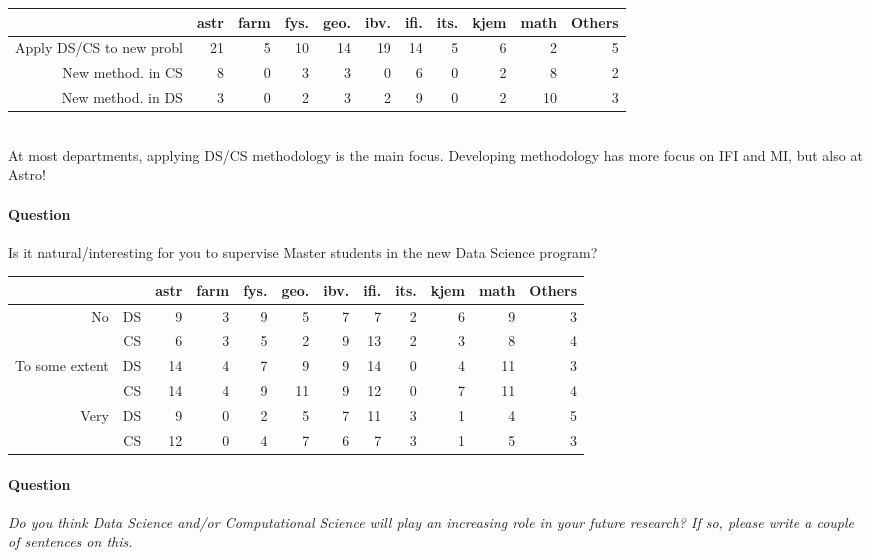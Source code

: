 \documentclass[a4paper,10pt]{article}
\begin{document}
\begin{tabular}{rrrrrrrrrrr}
  \hline
  
 & astr & farm & fys. & geo. & ibv. & ifi. & its. & kjem & math & Others \\ 
  \hline
Apply DS/CS to new probl &  21 &   5 &  10 &  14 &  19 &  14 &   5 &   6 &   2 &   5 \\ 
  New method. in CS &   8 &   0 &   3 &   3 &   0 &   6 &   0 &   2 &   8 &   2 \\ 
  New method. in DS &   3 &   0 &   2 &   3 &   2 &   9 &   0 &   2 &  10 &   3 \\ 
   \hline
\end{tabular}\\

At most departments, applying DS/CS methodology is the main focus. Developing methodology has more focus on IFI and MI, but also at Astro!

\paragraph{Question} Is it natural/interesting for you to supervise Master students in the new Data Science program?

\begin{tabular}{rrrrrrrrrrrr}
  \hline
 && astr & farm & fys. & geo. & ibv. & ifi. & its. & kjem & math & Others \\ 
  \hline
No&DS &   9 &   3 &   9 &   5 &   7 &   7 &   2 &   6 &   9 &   3 \\ 
  &CS &   6 &   3 &   5 &   2 &   9 &  13 &   2 &   3 &   8 &   4 \\ 
To some extent&DS &  14 &   4 &   7 &   9 &   9 &  14 &   0 &   4 &  11 &   3 \\ 
              &CS &  14 &   4 &   9 &  11 &   9 &  12 &   0 &   7 &  11 &   4 \\ 
  Very &DS&   9 &   0 &   2 &   5 &   7 &  11 &   3 &   1 &   4 &   5 \\ 
       &CS&  12 &   0 &   4 &   7 &   6 &   7 &   3 &   1 &   5 &   3 \\ 
   \hline
\end{tabular}

\paragraph{Question} \textit{Do you think Data Science and/or Computational Science will play an increasing role in your future research? If so, please write a couple of sentences on this.}
\end{document}
